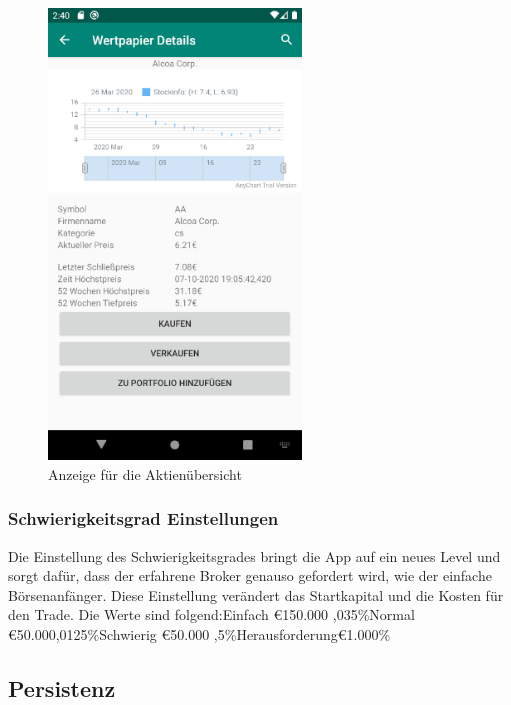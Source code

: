 \documentclass[10pt]{scrartcl}
\begin{document}
    \begin{figure}[H]
		\centering
		\includegraphics[width=0.6\textwidth]{Bilder/Prsi/detailansicht.png}
		\caption{Anzeige für die Aktienübersicht}
	\end{figure} 
	\newpage
	\subsubsection{Schwierigkeitsgrad Einstellungen}
		Die Einstellung des Schwierigkeitsgrades bringt die App auf ein neues Level und sorgt dafür, dass der erfahrene Broker genauso gefordert wird, wie der einfache Börsenanfänger. Diese Einstellung verändert das Startkapital und die Kosten für den Trade.
		\newline \newline Die Werte sind folgend:\newline Einfach \quad \quad \quad \quad \euro{150.000} \quad {},035\%\newline Normal \quad \quad \quad \quad \euro{50.000}\quad \quad {},0125\%\newline Schwierig \quad \quad \quad  \euro{50.000} \quad \quad {},5\%\newline Herausforderung\quad \euro{1.000}\quad  \quad \quad 0.5\%
	\subsection{Persistenz}
	
\end{document}

